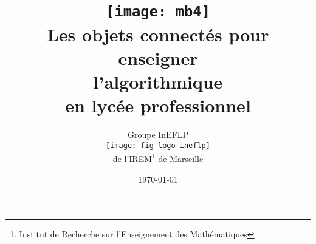 \documentclass[10pt]{article}
\title{%
    \Huge
    \texttt{[image: mb4]}\\[2cm]
    Les objets connectés pour enseigner\\
    l'algorithmique\\
    en lycée professionnel}
\author{%
    Groupe InEFLP\\
    \texttt{[image: fig-logo-ineflp]}\\
    de l'IREM\footnote{Institut de Recherche sur l'Enseignement des Mathématiques} de Marseille
    }
\date{\today}
\begin{document}
\newpage\nopagecolor



\newpage






\end{document}
